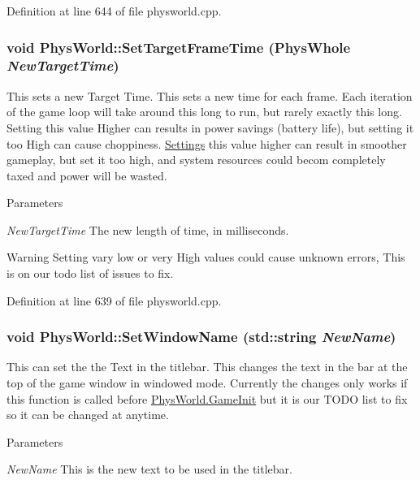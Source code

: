 Definition at line 644 of file physworld.cpp.\hypertarget{classPhysWorld_ab1c6f9286bd97eb502d8b0ddc4954566}{
\subsubsection[{SetTargetFrameTime}]{\setlength{\rightskip}{0pt plus 5cm}void PhysWorld::SetTargetFrameTime (PhysWhole {\em NewTargetTime})}}
\label{db/df5/classPhysWorld_ab1c6f9286bd97eb502d8b0ddc4954566}


This sets a new Target Time. This sets a new time for each frame. Each iteration of the game loop will take around this long to run, but rarely exactly this long. Setting this value Higher can results in power savings (battery life), but setting it too High can cause choppiness. \hyperlink{classSettings}{Settings} this value higher can result in smoother gameplay, but set it too high, and system resources could becom completely taxed and power will be wasted. 
\begin{DoxyParams}{Parameters}
\item[{\em NewTargetTime}]The new length of time, in milliseconds. \end{DoxyParams}
\begin{DoxyWarning}{Warning}
Setting vary low or very High values could cause unknown errors, This is on our todo list of issues to fix. 
\end{DoxyWarning}


Definition at line 639 of file physworld.cpp.\hypertarget{classPhysWorld_adb5ba2b5a3140c5d7033d3180e3f7342}{
\subsubsection[{SetWindowName}]{\setlength{\rightskip}{0pt plus 5cm}void PhysWorld::SetWindowName (std::string {\em NewName})}}
\label{db/df5/classPhysWorld_adb5ba2b5a3140c5d7033d3180e3f7342}


This can set the the Text in the titlebar. This changes the text in the bar at the top of the game window in windowed mode. Currently the changes only works if this function is called before \hyperlink{classPhysWorld_afc5116f97cc1e91e899d1a1ca7e14e9b}{PhysWorld.GameInit} but it is our TODO list to fix so it can be changed at anytime. 
\begin{DoxyParams}{Parameters}
\item[{\em NewName}]This is the new text to be used in the titlebar. \end{DoxyParams}


